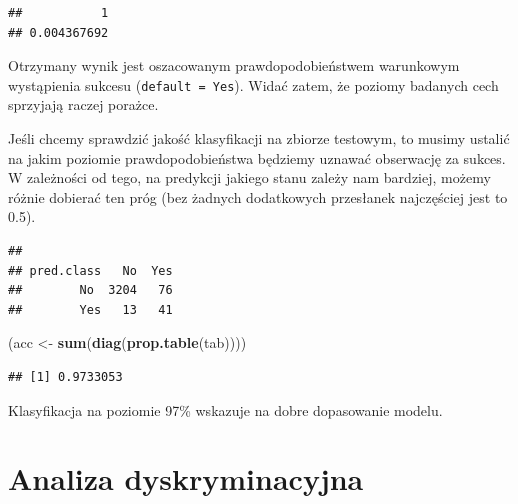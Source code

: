 \documentclass[]{book}
\newenvironment{Shaded}{\begin{snugshade}}{\end{snugshade}}
\newcommand{\DataTypeTok}[1]{\textcolor[rgb]{0.13,0.29,0.53}{#1}}
\newcommand{\FloatTok}[1]{\textcolor[rgb]{0.00,0.00,0.81}{#1}}
\newcommand{\KeywordTok}[1]{\textcolor[rgb]{0.13,0.29,0.53}{\textbf{#1}}}
\newcommand{\NormalTok}[1]{#1}
\newcommand{\OperatorTok}[1]{\textcolor[rgb]{0.81,0.36,0.00}{\textbf{#1}}}
\newcommand{\StringTok}[1]{\textcolor[rgb]{0.31,0.60,0.02}{#1}}
\theoremstyle{plain}
\theoremstyle{definition}
\theoremstyle{definition}
\theoremstyle{definition}
\theoremstyle{definition}
\theoremstyle{remark}
\begin{document}
\begin{verbatim}
##           1 
## 0.004367692
\end{verbatim}

Otrzymany wynik jest oszacowanym prawdopodobieństwem warunkowym wystąpienia sukcesu (\texttt{default\ =\ Yes}). Widać zatem, że poziomy badanych cech sprzyjają raczej porażce.

Jeśli chcemy sprawdzić jakość klasyfikacji na zbiorze testowym, to musimy ustalić na jakim poziomie prawdopodobieństwa będziemy uznawać obserwację za sukces. W zależności od tego, na predykcji jakiego stanu zależy nam bardziej, możemy różnie dobierać ten próg (bez żadnych dodatkowych przesłanek najczęściej jest to 0.5).

\begin{Shaded}
\end{Shaded}

\begin{verbatim}
##           
## pred.class   No  Yes
##        No  3204   76
##        Yes   13   41
\end{verbatim}

\begin{Shaded}
\begin{Highlighting}[]
\NormalTok{(acc <-}\StringTok{ }\KeywordTok{sum}\NormalTok{(}\KeywordTok{diag}\NormalTok{(}\KeywordTok{prop.table}\NormalTok{(tab))))}
\end{Highlighting}
\end{Shaded}

\begin{verbatim}
## [1] 0.9733053
\end{verbatim}

Klasyfikacja na poziomie 97\% wskazuje na dobre dopasowanie modelu.

\hypertarget{LDA}{%
\chapter{Analiza dyskryminacyjna}\label{LDA}}
\end{document}
